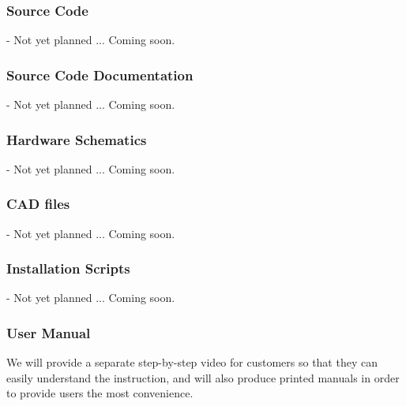 \subsubsection{Source Code}
- Not yet planned ... Coming soon.%

\subsubsection{Source Code Documentation}
- Not yet planned ... Coming soon.%

\subsubsection{Hardware Schematics}
- Not yet planned ... Coming soon.%

\subsubsection{CAD files}
- Not yet planned ... Coming soon. %

\subsubsection{Installation Scripts}
- Not yet planned ... Coming soon. %

\subsubsection{User Manual}
We will provide a separate step-by-step video for customers so that they can easily understand the instruction, and will also produce printed manuals in order to provide users the most convenience.
